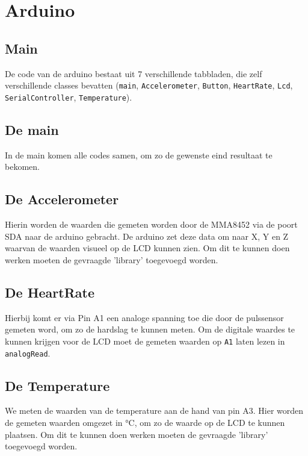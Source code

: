 \documentclass[a4paper]{report}
\newcommand{\code}[1]{\colorbox{light-gray}{\texttt{#1}}}
\begin{document}
    \section{Arduino}
        \subsection{Main}
            De code van de arduino bestaat uit 7 verschillende tabbladen, die zelf verschillende classes bevatten
            (\code{main}, \code{Accelerometer}, \code{Button}, \code{HeartRate}, \code{Lcd}, \code{SerialController}, \code{Temperature}).
            \subsection{De main}
                In de main komen alle codes samen, om zo de gewenste eind resultaat te bekomen.
                
            \subsection{De Accelerometer}
                Hierin worden de waarden die gemeten worden door de MMA8452 \cite{accel5} via de poort SDA naar de arduino gebracht.
                De arduino zet deze data om naar X, Y en Z waarvan de waarden visueel op de LCD \cite{lcd1} kunnen zien.
                Om dit te kunnen doen werken moeten de gevraagde 'library' toegevoegd worden.
                
            \subsection{De HeartRate}
                Hierbij komt er via Pin A1 een analoge spanning toe die door de pulssensor \cite{heart7} gemeten word, om zo de hardslag te kunnen meten.
                Om de digitale waardes te kunnen krijgen voor de LCD \cite{lcd1} moet de gemeten waarden op \code{A1} laten lezen in \code{analogRead}.
                
            \subsection{De Temperature}
                We meten de waarden van de temperature \cite{temp1} aan de hand van pin A3.
                Hier worden de gemeten waarden omgezet in °C, om zo de waarde op de LCD \cite{lcd1} te kunnen plaatsen.
                Om dit te kunnen doen werken moeten de gevraagde 'library' toegevoegd worden.
                
\end{document}
